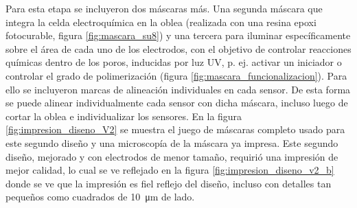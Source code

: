 				 Para esta etapa se incluyeron dos máscaras más. Una segunda máscara que integra la celda electroquímica en la oblea (realizada con una resina epoxi fotocurable, figura \ref{fig:mascara_su8}) y una tercera para iluminar específicamente sobre el área de cada uno de los electrodos, con el objetivo de controlar reacciones químicas dentro de los poros, inducidas por luz UV, p. ej. activar un iniciador o controlar el grado de polimerización  (figura \ref{fig:mascara_funcionalizacion}).\cite{Andrieu-Brunsen2015,Herzog2015,Silies2015} Para ello se incluyeron marcas de alineación individuales en cada sensor. De esta forma se puede alinear individualmente cada sensor con dicha máscara, incluso luego de cortar la oblea e individualizar los sensores. En la figura \ref{fig:impresion_diseno_V2} se muestra el juego de máscaras completo usado para este segundo diseño y una microscopía de la máscara ya impresa. Este segundo diseño, mejorado y con electrodos de menor tamaño, requirió una impresión de mejor calidad, lo cual se ve reflejado en la figura \ref{fig:impresion_diseno_v2_b} donde se ve que la impresión es fiel reflejo del diseño, incluso con detalles tan pequeños como cuadrados de \SI{10}{\um} de lado. 

